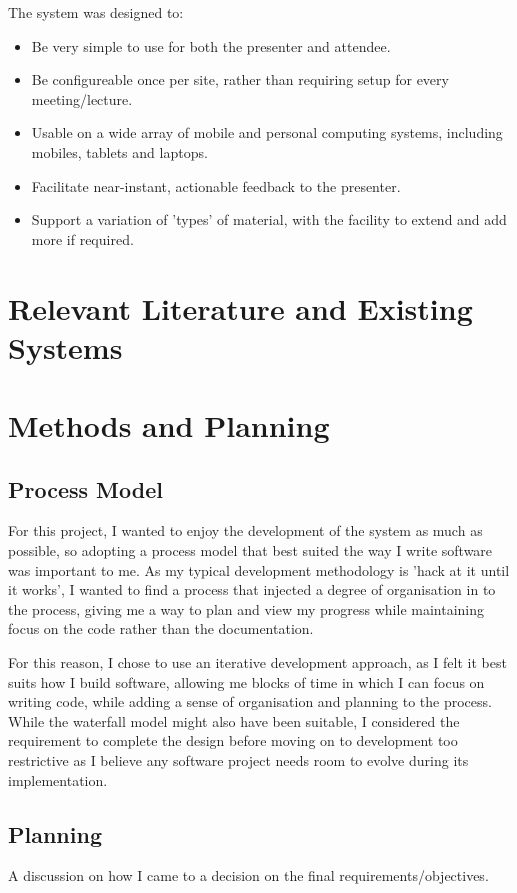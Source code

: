\documentclass[a4papert,11pt,notitlepage]{ltxdoc}
\begin{document}
The system was designed to:
\begin{itemize}
\item Be very simple to use for both the presenter and attendee.
\item Be configureable once per site, rather than requiring setup for every meeting/lecture.
\item Usable on a wide array of mobile and personal computing systems, including mobiles, tablets and laptops.
\item Facilitate near-instant, actionable feedback to the presenter.
\item Support a variation of 'types' of material, with the facility to extend and add more if required.
\end{itemize}

\section{Relevant Literature and Existing Systems}

\section{Methods and Planning}
\subsection{Process Model}
For this project, I wanted to enjoy the development of the system as much as possible, so adopting a process model that best suited the way I write software was important to me. As my typical development methodology is 'hack at it until it works', I wanted to find a process that injected a degree of organisation in to the process, giving me a way to plan and view my progress while maintaining focus on the code rather than the documentation.

For this reason, I chose to use an iterative development approach, as I felt it best suits how I build software, allowing me blocks of time in which I can focus on writing code, while adding a sense of organisation and planning to the process. While the waterfall model might also have been suitable, I considered the requirement to complete the design before moving on to development too restrictive as I believe any software project needs room to evolve during its implementation.

\subsection{Planning}
A discussion on how I came to a decision on the final requirements/objectives.
\end{document}
